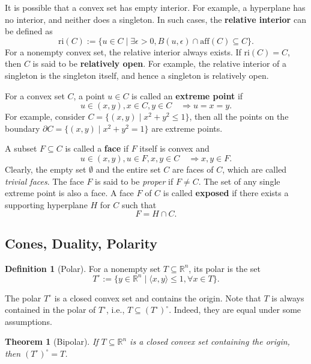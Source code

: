 \documentclass[
]{book}
\newtheorem{theorem}{Theorem}[chapter]
\theoremstyle{definition}
\newtheorem{definition}{Definition}[chapter]
\theoremstyle{definition}
\theoremstyle{definition}
\theoremstyle{definition}
\theoremstyle{remark}
\begin{document}
It is possible that a convex set has empty interior. For example, a hyperplane has no interior, and neither does a singleton. In such cases, the \textbf{relative interior} can be defined as
\[
\mathrm{ri}(C) := \{  u \in C \mid \exists \epsilon > 0, B(u,\epsilon) \cap \mathrm{aff}(C) \subseteq C  \}.
\]
For a nonempty convex set, the relative interior always exists. If \(\mathrm{ri}(C) = C\), then \(C\) is said to be \textbf{relatively open}. For example, the relative interior of a singleton is the singleton itself, and hence a singleton is relatively open.

For a convex set \(C\), a point \(u \in C\) is called an \textbf{extreme point} if
\[
u \in (x,y), x \in C, y \in C \quad \Rightarrow u = x = y.
\]
For example, consider \(C = \{ (x,y)\mid x^2 + y^2 \leq 1 \}\), then all the points on the boundary \(\partial C = \{ (x,y) \mid x^2 + y^2 = 1 \}\) are extreme points.

A subset \(F \subseteq C\) is called a \textbf{face} if \(F\) itself is convex and
\[
u \in (x,y), u \in F, x,y \in C \quad \Rightarrow x,y \in F. 
\]
Clearly, the empty set \(\emptyset\) and the entire set \(C\) are faces of \(C\), which are called \emph{trivial faces}. The face \(F\) is said to be \emph{proper} if \(F \neq C\). The set of any single extreme point is also a face. A face \(F\) of \(C\) is called \textbf{exposed} if there exists a supporting hyperplane \(H\) for \(C\) such that
\[
F = H \cap C.
\]

\hypertarget{cones-duality-polarity}{%
\subsection{Cones, Duality, Polarity}\label{cones-duality-polarity}}

\begin{definition}[Polar]
\protect\hypertarget{def:polar}{}\label{def:polar}For a nonempty set \(T \subseteq \mathbb{R}^{n}\), its polar is the set
\begin{equation}
T^\circ := \{  y \in \mathbb{R}^{n} \mid \langle x, y \rangle \leq 1, \forall x \in T  \}.
\label{eq:polar}
\end{equation}
\end{definition}

The polar \(T^\circ\) is a closed convex set and contains the origin. Note that \(T\) is always contained in the polar of \(T^\circ\), i.e., \(T \subseteq (T^\circ)^\circ\). Indeed, they are equal under some assumptions.

\begin{theorem}[Bipolar]
\protect\hypertarget{thm:bipolar}{}\label{thm:bipolar}If \(T \subseteq \mathbb{R}^{n}\) is a closed convex set containing the origin, then \((T^\circ)^\circ = T\).
\end{theorem}
\end{document}
